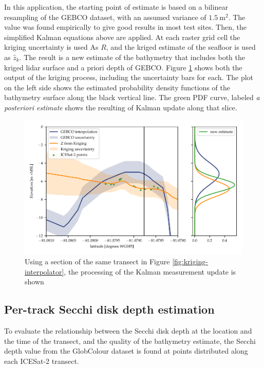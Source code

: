 In this application, the starting point of estimate is based on a bilinear resampling of the GEBCO dataset, with an assumed variance of $1.5~\text{m}^2$. The value was found empirically to give good results in most test sites. Then, the simplified Kalman equations above are applied. At each raster grid cell the kriging uncertainty is used As $R$, and the kriged estimate of the seafloor is used as $\hat{z}_k$. The result is a new estimate of the bathymetry that includes both the kriged lidar surface and a priori depth of GEBCO. Figure \ref{fig:Kalman-figure} shows both the output of the kriging process, including the uncertainty bars for each. The plot on the left side shows the estimated probability density functions of the bathymetry surface along the black vertical line. The green PDF curve, labeled \emph{a posteriori estimate} shows the resulting of Kalman update along that slice.

\begin{figure}[htb]
    \centering
    \includegraphics[width=\textwidth]{figures/methodology-Kalman-updating.pdf}
    \caption{Using a section of the same transect in Figure \ref{fig:kriging-interpolator}, the processing of the Kalman measurement update is shown}
    \label{fig:Kalman-figure}
\end{figure}

\subsection{Per-track Secchi disk depth estimation}
To evaluate the relationship between the Secchi disk depth at the location and the time of the transect, and the quality of the bathymetry estimate, the Secchi depth value from the GlobColour dataset \parencite{Garnesson2019} is found at points distributed along each ICESat-2 transect. 

